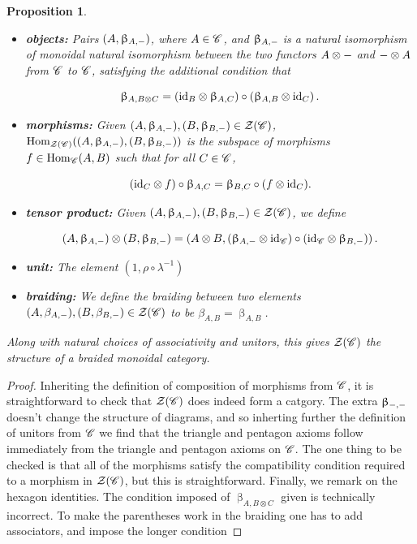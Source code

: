 \documentclass{article}
\newtheorem{proposition}{Proposition}[section]
\theoremstyle{definition}
\numberwithin{figure}{section}
\begin{document}
\begin{enumerate}[\thesection .1.]
\begin{proposition}
\begin{itemize}
\item \textbf{objects:} Pairs $(A,\upbeta_{A,\--})$, where $A\in \mathscr{C}$, and $\upbeta_{A,\--}$ is a natural isomorphism of monoidal natural isomorphism between the two functors $A\otimes \--$ and $\--\otimes A$ from $\mathscr{C}$ to $\mathscr{C}$, satisfying the additional condition that

$$\upbeta_{A,B\otimes C}=\left(\mathrm{id}_{B}\otimes \upbeta_{A,C}\right)\circ \left(\upbeta_{A,B}\otimes \mathrm{id}_C\right).$$

\item \textbf{morphisms:} Given $(A,\upbeta_{A,\--}), (B,\upbeta_{B,\--})\in \mathcal{Z}(\mathscr{C})$, $\mathrm{Hom}_{\mathcal{Z}(\mathscr{C})}((A,\upbeta_{A,\--}),(B,\upbeta_{B,\--}))$ is the subspace of morphisms $f\in \mathrm{Hom}_{\mathscr{C}}(A,B)$ such that for all $C\in \mathscr{C}$,

$$\left(\mathrm{id}_{C}\otimes f\right)\circ \upbeta_{A,C}=\upbeta_{B,C}\circ (f\otimes \mathrm{id}_C).$$

\item \textbf{tensor product:} Given $(A,\upbeta_{A,\--}), (B,\upbeta_{B,\--})\in \mathcal{Z}(\mathscr{C})$, we define

$$(A,\upbeta_{A,\--})\otimes (B,\upbeta_{B,\--})=\left(A\otimes B, (\upbeta_{A,\--}\otimes \mathrm{id}_{\mathscr{C}})\circ (\mathrm{id}_{\mathscr{C}}\otimes \upbeta_{B,\--}) \right).$$

\item \textbf{unit: } The element $(1,\rho\circ \lambda^{-1})$

\item \textbf{braiding: } We define the braiding between two elements $(A,\beta_{A,\--}), (B,\beta_{B,\--})\in \mathcal{Z}(\mathscr{C})$ to be $\beta_{A,B}=\upbeta_{A,B}$.
\end{itemize}

Along with natural choices of associativity and unitors, this gives $\mathcal{Z}(\mathscr{C})$ the structure of a braided monoidal category.
\end{proposition}
\begin{proof} Inheriting the definition of composition of morphisms from $\mathscr{C}$, it is straightforward to check that $\mathcal{Z}(\mathscr{C})$ does indeed form a catgory. The extra $\upbeta_{\--,\--}$ doesn't change the structure of diagrams, and so inherting further the definition of unitors from $\mathscr{C}$ we find that the triangle and pentagon axioms follow immediately from the triangle and pentagon axioms on $\mathscr{C}$. The one thing to be checked is that all of the morphisms satisfy the compatibility condition required to a morphism in $\mathcal{Z}(\mathscr{C})$, but this is straightforward. Finally, we remark on the hexagon identities. The condition imposed of $\upbeta_{A,B\otimes C}$ given is technically incorrect. To make the parentheses work in the braiding one has to add associators, and impose the longer condition


\end{proof}
\end{enumerate}
\end{document}
